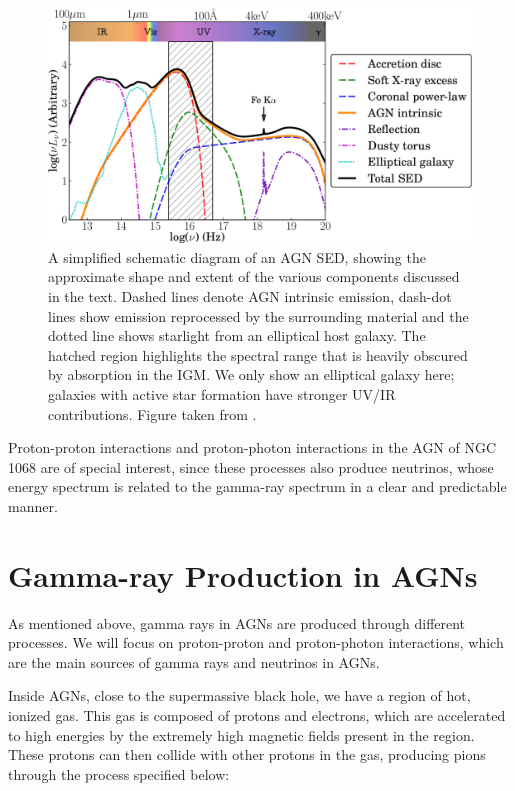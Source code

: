 \begin{figure}[h]
    \centering
    \includegraphics[width=\textwidth]{Figures/AGN SED.png}
    \caption{A simplified schematic diagram of an AGN SED, showing the approximate shape and extent of the various components discussed in the text. Dashed lines denote AGN intrinsic emission, dash-dot lines show emission reprocessed by the surrounding material and the dotted line shows starlight from an elliptical host galaxy. The hatched region highlights the spectral range that is heavily obscured by absorption in the IGM. We only show an elliptical galaxy here; galaxies with active star formation have stronger UV/IR contributions. Figure taken from \citet{QuasarSEDCollinson_2016}.}
    \label{fig:AGN_SED}
\end{figure}

Proton-proton interactions and proton-photon interactions in the AGN of NGC 1068 are of special interest, since these processes also produce neutrinos, whose energy spectrum is related to the gamma-ray spectrum in a clear and predictable manner.


\section{Gamma-ray Production in AGNs}

As mentioned above, gamma rays in AGNs are produced through different processes. We will focus on proton-proton and proton-photon interactions, which are the main sources of gamma rays and neutrinos in AGNs.

Inside AGNs, close to the supermassive black hole, we have a region of hot, ionized gas. This gas is composed of protons and electrons, which are accelerated to high energies by the extremely high magnetic fields present in the region. These protons can then collide with other protons in the gas, producing pions through the process specified below:



